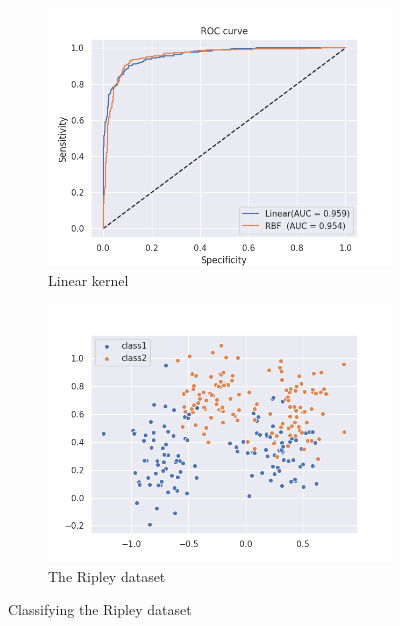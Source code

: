 \documentclass{article}
\begin{document}
\begin{figure}[]
\begin{subfigure}{0.45\linewidth}
            \includegraphics[width=\linewidth]{roc_ripley}
            \caption{Linear kernel}
        \end{subfigure}
         \begin{subfigure}{0.45\linewidth}
            \includegraphics[width=\linewidth]{ripley}
            \caption{The Ripley dataset}
        \end{subfigure}
                   
\caption{Classifying the Ripley dataset}        
        
             
        \label{fig:ripley}
    \end{figure}
\end{document}
